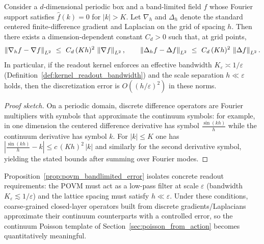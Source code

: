 \begin{proposition}
\label{prop:povm_bandlimited_error}
Consider a $d$-dimensional periodic box and a band-limited field $f$ whose Fourier support satisfies $\widehat f(k)=0$ for $|k|>K$.
Let $\nabla_h$ and $\Delta_h$ denote the standard centered finite-difference gradient and Laplacian on the grid of spacing $h$.
Then there exists a dimension-dependent constant $C_d>0$ such that, at grid points,
\[
\left\lVert \nabla_h f-\nabla f\right\rVert_{L^2}\ \le\ C_d\,(Kh)^2\,\left\lVert \nabla f\right\rVert_{L^2},
\qquad
\left\lVert \Delta_h f-\Delta f\right\rVert_{L^2}\ \le\ C_d\,(Kh)^2\,\left\lVert \Delta f\right\rVert_{L^2}.
\]
In particular, if the readout kernel enforces an effective bandwidth $K_\varepsilon\asymp 1/\varepsilon$ (Definition~\ref{def:kernel_readout_bandwidth}) and the scale separation $h\ll \varepsilon$ holds, then the discretization error is $O((h/\varepsilon)^2)$ in these norms.
\end{proposition}

\begin{proof}[Proof sketch]
On a periodic domain, discrete difference operators are Fourier multipliers with symbols that approximate the continuum symbols:
for example, in one dimension the centered difference derivative has symbol $\frac{\sin(kh)}{h}$ while the continuum derivative has symbol $k$.
For $|k|\le K$ one has $\left|\frac{\sin(kh)}{h}-k\right|\le c\,(Kh)^2\,|k|$ and similarly for the second derivative symbol, yielding the stated bounds after summing over Fourier modes.
\end{proof}

\begin{remark}
\label{rem:povm_regular_interpretation}
Proposition~\ref{prop:povm_bandlimited_error} isolates concrete readout requirements:
the POVM must act as a low-pass filter at scale $\varepsilon$ (bandwidth $K_\varepsilon\lesssim 1/\varepsilon$) and the lattice spacing must satisfy $h\ll \varepsilon$.
Under these conditions, coarse-grained closed-layer operators built from discrete gradients/Laplacians approximate their continuum counterparts with a controlled error, so the continuum Poisson template of Section~\ref{sec:poisson_from_action} becomes quantitatively meaningful.
\end{remark}


